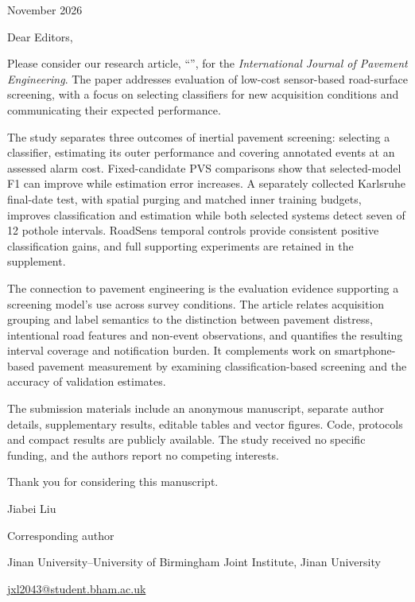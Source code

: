\documentclass[12pt]{article}
\begin{document}
\singlespacing
{} November 2026\par\bigskip
\noindent Dear Editors,\par\medskip
Please consider our research article, ``\articletitle'', for the \emph{International Journal of Pavement Engineering}. The paper addresses evaluation of low-cost sensor-based road-surface screening, with a focus on selecting classifiers for new acquisition conditions and communicating their expected performance.
\par\medskip
The study separates three outcomes of inertial pavement screening: selecting a classifier, estimating its outer performance and covering annotated events at an assessed alarm cost. Fixed-candidate PVS comparisons show that selected-model F1 can improve while estimation error increases. A separately collected Karlsruhe final-date test, with spatial purging and matched inner training budgets, improves classification and estimation while both selected systems detect seven of 12 pothole intervals. RoadSens temporal controls provide consistent positive classification gains, and full supporting experiments are retained in the supplement.
\par\medskip
The connection to pavement engineering is the evaluation evidence supporting a screening model's use across survey conditions. The article relates acquisition grouping and label semantics to the distinction between pavement distress, intentional road features and non-event observations, and quantifies the resulting interval coverage and notification burden. It complements work on smartphone-based pavement measurement by examining classification-based screening and the accuracy of validation estimates.
\par\medskip
The submission materials include an anonymous manuscript, separate author details, supplementary results, editable tables and vector figures. Code, protocols and compact results are publicly available. The study received no specific funding, and the authors report no competing interests.
\par\medskip
Thank you for considering this manuscript.\par\bigskip
\noindent Jiabei Liu\par
Corresponding author\par
Jinan University--University of Birmingham Joint Institute, Jinan University\par
\href{mailto:jxl2043@student.bham.ac.uk}{jxl2043@student.bham.ac.uk}
\end{document}
